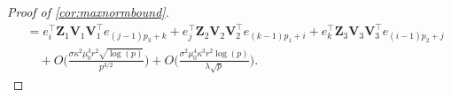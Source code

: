 \documentclass[10pt]{article}
\newcommand{\0}{{\mathbf{0}}}
\newcommand{\1}{{\mathbf{1}}}
\renewcommand{\t}{^{\top}}
\newcommand{\p}{\mathbb{P}}
\renewcommand{\hat}{\widehat}
\renewcommand{\hat}{\widehat}
\begin{document}
\begin{proof}[Proof of \cref{cor:maxnormbound}]
\begin{align}
    &= e_i\t \mathbf{Z}_1 \mathbf{V}_1 \mathbf{V}_1\t e_{(j-1)p_3 + k} + e_j\t \mathbf{Z}_2 \mathbf{V}_2 \mathbf{V}_2\t e_{(k-1)p_1 + i} + e_k\t \mathbf{Z}_3 \mathbf{V}_3 \mathbf{V}_3\t e_{(i-1)p_2 + j} \nonumber\\
     &\quad + O\bigg(\frac{\sigma \kappa^2 \mu_0^3 r^2 \sqrt{ \log(p)}}{p^{3/2}} \bigg)+  O\bigg( \frac{\sigma^2 \mu_0^4 \kappa^3 r^{2} \log(p)}{\lambda \sqrt{p}}\bigg). \nonumber  %
\end{align}

\end{proof}
\end{document}
